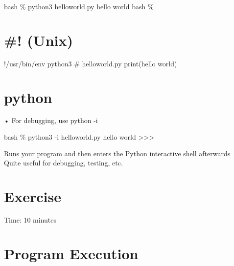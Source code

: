\documentclass[
  letterpaper,
  DIV=11,
  numbers=noendperiod]{scrreprt}
\newenvironment{Shaded}{\begin{snugshade}}{\end{snugshade}}
\newcommand{\NormalTok}[1]{\textcolor[rgb]{0.00,0.23,0.31}{#1}}
\begin{document}
\begin{Shaded}
\begin{Highlighting}[]
\NormalTok{bash \% python3 helloworld.py  }
\NormalTok{hello world  }
\NormalTok{bash \% }
\end{Highlighting}
\end{Shaded}


\chapter{\#! (Unix)}\label{unix}

\begin{Shaded}
\begin{Highlighting}[]
\NormalTok{!/usr/bin/env python3 \# helloworld.py print(\textquotesingle{}hello world\textquotesingle{}) }
\end{Highlighting}
\end{Shaded}


\chapter{python}\label{python}

• For debugging, use python -i

\begin{Shaded}
\begin{Highlighting}[]
\NormalTok{bash \% python3 {-}i helloworld.py  }
\NormalTok{hello world  }
\NormalTok{\textgreater{}\textgreater{}\textgreater{} }
\end{Highlighting}
\end{Shaded}

Runs your program and then enters the Python interactive shell
afterwards\\
Quite useful for debugging, testing, etc.


\chapter{Exercise}\label{exercise}

Time: 10 minutes


\chapter{Program Execution}\label{program-execution}
\end{document}
